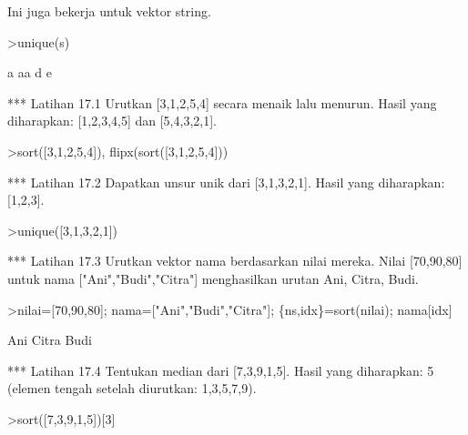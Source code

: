 \documentclass[a4paper,10pt]{article}
\begin{document}
\begin{eulernotebook}
\begin{eulercomment}
\begin{eulercomment}
\begin{eulercomment}
\begin{eulercomment}
\begin{eulercomment}
\begin{eulercomment}
\begin{eulercomment}
\begin{eulercomment}
\begin{eulercomment}
\begin{eulercomment}
\begin{eulercomment}
\begin{eulercomment}
\begin{eulercomment}
\begin{eulercomment}
\begin{eulercomment}
\begin{eulercomment}
\begin{eulercomment}
\begin{eulercomment}
\begin{eulercomment}
\begin{eulercomment}
\begin{euleroutput}
  [1,  2,  3,  4,  5,  6,  8,  9]
\end{euleroutput}
\begin{eulercomment}
Ini juga bekerja untuk vektor string.
\end{eulercomment}
\begin{eulerprompt}
>unique(s)
\end{eulerprompt}
\begin{euleroutput}
  a
  aa
  d
  e
\end{euleroutput}
\begin{eulercomment}
*** Latihan 17.1
Urutkan [3,1,2,5,4] secara menaik lalu menurun.
Hasil yang diharapkan: [1,2,3,4,5] dan [5,4,3,2,1].
\end{eulercomment}
\begin{eulerprompt}
>sort([3,1,2,5,4]), flipx(sort([3,1,2,5,4]))
\end{eulerprompt}
\begin{euleroutput}
  [1,  2,  3,  4,  5]
  [5,  4,  3,  2,  1]
\end{euleroutput}
\begin{eulercomment}
*** Latihan 17.2
Dapatkan unsur unik dari [3,1,3,2,1]. Hasil yang diharapkan: [1,2,3].
\end{eulercomment}
\begin{eulerprompt}
>unique([3,1,3,2,1])
\end{eulerprompt}
\begin{euleroutput}
  [1,  2,  3]
\end{euleroutput}
\begin{eulercomment}
*** Latihan 17.3
Urutkan vektor nama berdasarkan nilai mereka.
Nilai [70,90,80] untuk nama ["Ani","Budi","Citra"] menghasilkan urutan
Ani, Citra, Budi.
\end{eulercomment}
\begin{eulerprompt}
>nilai=[70,90,80]; nama=["Ani","Budi","Citra"]; \{ns,idx\}=sort(nilai); nama[idx]
\end{eulerprompt}
\begin{euleroutput}
  Ani
  Citra
  Budi
\end{euleroutput}
\begin{eulercomment}
*** Latihan 17.4
Tentukan median dari [7,3,9,1,5]. Hasil yang diharapkan: 5 (elemen tengah
setelah diurutkan: 1,3,5,7,9).
\end{eulercomment}
\begin{eulerprompt}
>sort([7,3,9,1,5])[3]

\end{eulerprompt}
\end{eulercomment}
\end{eulercomment}
\end{eulercomment}
\end{eulercomment}
\end{eulercomment}
\end{eulercomment}
\end{eulercomment}
\end{eulercomment}
\end{eulercomment}
\end{eulercomment}
\end{eulercomment}
\end{eulercomment}
\end{eulercomment}
\end{eulercomment}
\end{eulercomment}
\end{eulercomment}
\end{eulercomment}
\end{eulercomment}
\end{eulercomment}
\end{eulercomment}
\end{eulernotebook}
\end{document}
